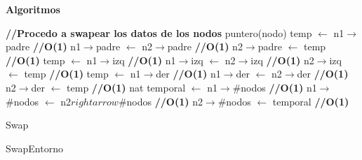 \documentclass[a4paper,10pt]{article}
\newenvironment{Algoritmos}{%
  \vspace*{2ex}%
  \noindent\textbf{\Large Algoritmos}%
  \vspace*{2ex}%
}{}
\begin{document}
\begin{Algoritmos}
\begin{algorithm}[H]
{    \hfill \textbf{//Procedo a swapear los datos de los nodos}
    \newline puntero(nodo) temp $\leftarrow$ n1$\rightarrow$padre \hfill \textbf{//O(1)}
    \newline n1$\rightarrow$padre $\leftarrow$ n2$\rightarrow$padre \hfill \textbf{//O(1)}
    \newline n2$\rightarrow$padre $\leftarrow$ temp \hfill \textbf{//O(1)}
	\newline temp $\leftarrow$ n1$\rightarrow$izq \hfill \textbf{//O(1)}
    \newline n1$\rightarrow$izq $\leftarrow$ n2$\rightarrow$izq \hfill \textbf{//O(1)}
	\newline n2$\rightarrow$izq $\leftarrow$ temp \hfill \textbf{//O(1)}
    \newline temp $\leftarrow$ n1$\rightarrow$der \hfill \textbf{//O(1)}
    \newline n1$\rightarrow$der $\leftarrow$ n2$\rightarrow$der \hfill \textbf{//O(1)}
	\newline n2$\rightarrow$der $\leftarrow$ temp \hfill \textbf{//O(1)}
    \newline nat temporal $\leftarrow$ n1$\rightarrow$\#nodos \hfill \textbf{//O(1)}
    \newline n1$\rightarrow$\#nodos $\leftarrow$ n2$rightarrow$\#nodos \hfill \textbf{//O(1)}
    \newline n2$\rightarrow$\#nodos $\leftarrow$ temporal \hfill \textbf{//O(1)}

    
    }
    
    \caption{Swap}
   \end{algorithm}
   
   
    \newline
    \begin{algorithm}[H]
    \caption{SwapEntorno}
   \end{algorithm}
   

\end{Algoritmos}
\end{document}
